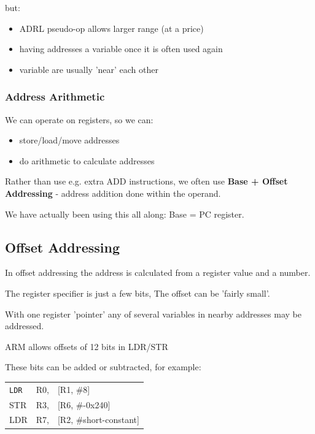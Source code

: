 but:

\begin{itemize}
  \item ADRL pseudo-op allows larger range (at a price)
  \item having addresses a variable once it is often used again
  \item variable are usually 'near' each other
\end{itemize}

\subsubsection{Address Arithmetic}
We can operate on registers, so we can:

\begin{itemize}
  \item store/load/move addresses
  \item do arithmetic to calculate addresses
\end{itemize}

Rather than use e.g. extra ADD instructions, we often use {\bf Base + Offset
Addressing} - address addition done within the operand.

We have actually been using this all along: Base = PC register.

\subsection{Offset Addressing}

In offset addressing the address is calculated from a register value and a
number.

The register specifier is just a few bits, The offset can be 'fairly small'.

With one register 'pointer' any of several variables in nearby addresses may be
addressed.

ARM allows offsets of 12 bits in LDR/STR

These bits can be added or subtracted, for example:

\begin{center}
    \begin{tabular}{l l l}
        {\tt LDR} & R0, & [R1, \#8] \\
        STR & R3, & [R6, \#-0x240]\\
        LDR & R7, & [R2, \#short-constant]
    \end{tabular}
\end{center}

